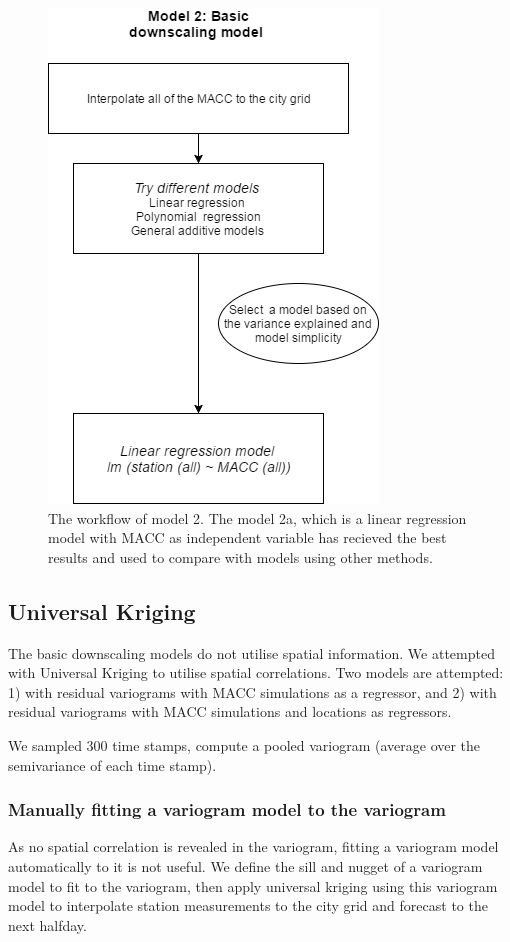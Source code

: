 \documentclass{article}
\begin{document}
\begin{figure}[!h]
\includegraphics[scale = 0.5]{diaM2.png}
\caption{The workflow of model 2. The model 2a, which is a linear regression model with MACC as independent variable has recieved the best results and used to compare with models using other methods. }
\label{fig:LR}
\end{figure}



\subsection{Universal Kriging}
The basic downscaling models do not utilise spatial information. We attempted with
Universal Kriging to utilise spatial correlations.
Two models are attempted: 1) with residual variograms with MACC simulations as a regressor, and 2) with residual variograms with MACC simulations and locations as regressors.

We sampled 300 time stamps, compute a pooled variogram (average over the semivariance of each time
stamp).

\subsubsection{Manually fitting a variogram model to the variogram}
As no spatial correlation is revealed in the variogram, fitting a variogram model automatically to it is not
useful. We define the sill and nugget of a variogram model to fit to the variogram, then apply universal
kriging using this variogram model to interpolate station measurements to the city grid and forecast to the
next halfday.
\end{document}
